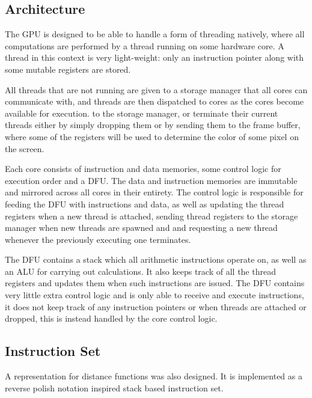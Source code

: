 		\subsection{Architecture}

			The GPU is designed to be able to handle a form of threading
			natively, where all computations are performed by a thread running
			on some hardware core. A thread in this context is very
			light-weight: only an instruction pointer along with some mutable
			registers are stored.

			All threads that are not running are given to a storage manager that all cores can communicate with, and threads are then
			dispatched to cores as the cores become available for execution.
			to the storage manager, or terminate their current threads either 
			by simply dropping them or by sending them to the frame buffer, 
			where some of the registers will be used to determine the color of 
			some pixel on the screen.

			Each core consists of instruction and data memories, some control 
			logic for execution order and a DFU. The data and instruction 
			memories are immutable and mirrored across all cores in their 
			entirety. The control logic is responsible for feeding the DFU with
			instructions and data, as well as updating the thread registers 
			when a new thread is attached, sending thread registers to the 
			storage manager when new threads are spawned and and 
			requesting a new thread whenever the previously executing one 
			terminates.
			
			The DFU contains a stack which all arithmetic instructions operate
			on, as well as an ALU for carrying out calculations. It also keeps
			track of all the thread registers and updates them when such
			instructions are issued. The DFU contains very little extra control
			logic and is only able to receive and execute instructions, it does
			not keep track of any instruction pointers or when threads are
			attached or dropped, this is instead handled by the core control
			logic.

		\subsection{Instruction Set}

			A representation for distance functions was also designed. It is
			implemented as a reverse polish notation inspired stack based 
			instruction set.

